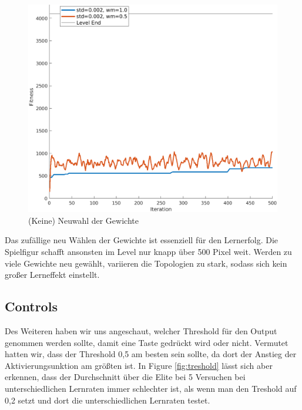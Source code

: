 \documentclass{hbrs-ecta-report}
\begin{document}
\begin{figure}[h!]
	\centering
	\includegraphics[width=\linewidth]{img/learningRates2.png}
	\caption{(Keine) Neuwahl der Gewichte}
	\label{fig:learningRates2} 
\end{figure}

Das zufällige neu Wählen der Gewichte ist essenziell für den Lernerfolg. Die Spielfigur schafft ansonsten im Level nur knapp über 500 Pixel weit. Werden zu viele Gewichte neu gewählt, variieren die Topologien zu stark, sodass sich kein großer Lerneffekt einstellt.

\newpage

\subsection{Controls}
Des Weiteren haben wir uns angeschaut, welcher Threshold für den Output genommen werden sollte, damit eine Taste gedrückt wird oder nicht. Vermutet hatten wir, dass der Threshold 0,5 am besten sein sollte, da dort der Anstieg der Aktivierungsunktion am größten ist. In Figure \ref{fig:treshold} lässt sich aber erkennen, dass der Durchschnitt über die Elite bei 5 Versuchen bei unterschiedlichen Lernraten immer schlechter ist, als wenn man den Treshold auf 0,2 setzt und dort die unterschiedlichen Lernraten testet. 
\end{document}
